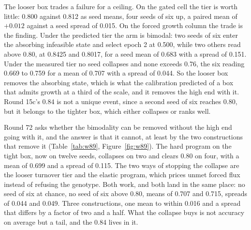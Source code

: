 


The looser box trades a failure for a ceiling. On the gated cell the tier is worth
little: 0.800 against 0.812 as seed means, four seeds of six up, a paired mean of
$+0.012$ against a seed spread of 0.015. On the forced growth column the trade is the
finding. Under the predicted tier the arm is bimodal: two seeds of six enter the
absorbing infeasible state and select epoch 2 at 0.500, while two others read above
0.80, at 0.8425 and 0.8017, for a seed mean of 0.683 with a spread of 0.151. Under the
measured tier no seed collapses and none exceeds 0.76, the six reading 0.669 to 0.759
for a mean of 0.707 with a spread of 0.044. So the looser box removes the absorbing
state, which is what the calibration predicted of a box that admits growth at a third
of the scale, and it removes the high end with it. Round 15c's 0.84 is not a unique
event, since a second seed of six reaches 0.80, but it belongs to the tighter box,
which either collapses or ranks well.

Round 72 asks whether the bimodality can be removed without the high end going with it,
and the answer is that it cannot, at least by the two constructions that remove it
(Table~\ref{tab:w89}, Figure~\ref{fig:w89}). The hard program on the tight box, now on
twelve seeds, collapses on two and clears 0.80 on four, with a mean of 0.699 and a
spread of 0.115. The two ways of stopping the collapse are the looser turnover tier and
the elastic program, which prices unmet forced flux instead of refusing the genotype.
Both work, and both land in the same place: no seed of six at chance, no seed of six
above 0.80, means of 0.707 and 0.715, spreads of 0.044 and 0.049. Three constructions,
one mean to within 0.016 and a spread that differs by a factor of two and a half. What
the collapse buys is not accuracy on average but a tail, and the 0.84 lives in it.

